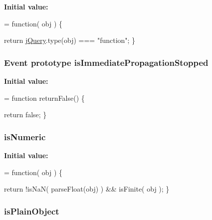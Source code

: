 {\bfseries Initial value\-:}
\begin{DoxyCode}
= \textcolor{keyword}{function}( obj ) \{


        \textcolor{keywordflow}{return} \hyperlink{jquery-1_810_82-vsdoc_8js_add5237586d970a38a81f990e8eb28c6c}{jQuery}.type(obj) === \textcolor{stringliteral}{"function"};
    \}
\end{DoxyCode}
\hypertarget{jquery-1_810_82-vsdoc_8js_a5fe8157d3a55c7b444e8d97b9dcde6a8}{
\subsubsection[{is\-Immediate\-Propagation\-Stopped}]{ {\bf Event} {\bf prototype} is\-Immediate\-Propagation\-Stopped}}\label{jquery-1_810_82-vsdoc_8js_a5fe8157d3a55c7b444e8d97b9dcde6a8}
{\bfseries Initial value\-:}
\begin{DoxyCode}
= \textcolor{keyword}{function} returnFalse() \{


    \textcolor{keywordflow}{return} \textcolor{keyword}{false};
\}
\end{DoxyCode}
\hypertarget{jquery-1_810_82-vsdoc_8js_aea21b7a3297c40d5d8862345d324796b}{
\subsubsection[{is\-Numeric}]{ is\-Numeric}}\label{jquery-1_810_82-vsdoc_8js_aea21b7a3297c40d5d8862345d324796b}
{\bfseries Initial value\-:}
\begin{DoxyCode}
= \textcolor{keyword}{function}( obj ) \{


        \textcolor{keywordflow}{return} !isNaN( parseFloat(obj) ) && isFinite( obj );
    \}
\end{DoxyCode}
\hypertarget{jquery-1_810_82-vsdoc_8js_ae530048a5c13705fa969015adba370e4}{
\subsubsection[{is\-Plain\-Object}]{ is\-Plain\-Object}}\label{jquery-1_810_82-vsdoc_8js_ae530048a5c13705fa969015adba370e4}
